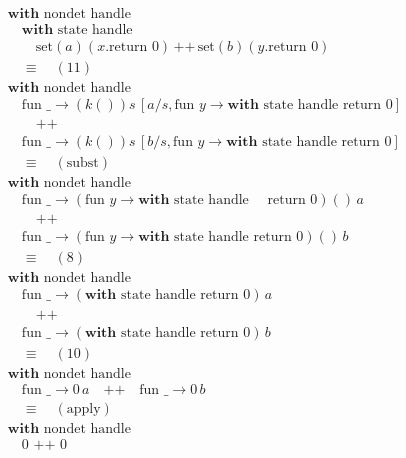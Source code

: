 \documentclass[logo,bsc,singlespacing,parskip]{infthesis}
\begin{document}
\[
\begin{array}{l}
\textbf{with } \text{nondet handle} \\
\quad \textbf{with } \text{state handle} \\
\quad\quad \text{set}(a)(x. \text{return } 0) \, \text{++} \, \text{set}(b)(y. \text{return } 0) \\[5pt]

\quad\equiv\quad (11) \\[5pt]

\textbf{with } \text{nondet handle} \\
\quad \text{fun } \_ \rightarrow (k())s \, [a/s, \text{fun } y \rightarrow \textbf{with } \text{state handle } \text{return } 0] \\
\quad\quad \text{++} \\
\quad \text{fun } \_ \rightarrow (k())s \, [b/s, \text{fun } y \rightarrow \textbf{with } \text{state handle } \text{return } 0] \\[5pt]

\quad\equiv\quad (\text{subst}) \\[5pt]
\textbf{with } \text{nondet handle} \\

\quad\text{fun } \_ \rightarrow (\text{fun } y \rightarrow \textbf{with } \text{state handle } \quad\text{return } 0)() \, a \\
\quad\quad \text{++} \\
\quad\text{fun } \_ \rightarrow (\text{fun } y \rightarrow \textbf{with } \text{state handle } \text{return } 0)() \, b \\[5pt]

\quad\equiv\quad (8) \\[5pt]

\textbf{with } \text{nondet handle} \\
\quad\text{fun } \_ \rightarrow (\textbf{with } \text{state handle } \text{return } 0) \, a \\
\quad\quad \text{++} \\
\quad\text{fun } \_ \rightarrow (\textbf{with } \text{state handle } \text{return } 0) \, b \\[5pt]

\quad\equiv\quad (10) \\[5pt]

\textbf{with } \text{nondet handle} \\
\quad\text{fun } \_ \rightarrow 0 \, a \quad \text{++} \quad \text{fun } \_ \rightarrow 0 \, b \\[5pt]

\quad\equiv\quad (\text{apply}) \\[5pt]

\textbf{with } \text{nondet handle} \\
\quad 0 \text{ ++ } 0
\end{array}
\]
\end{document}
